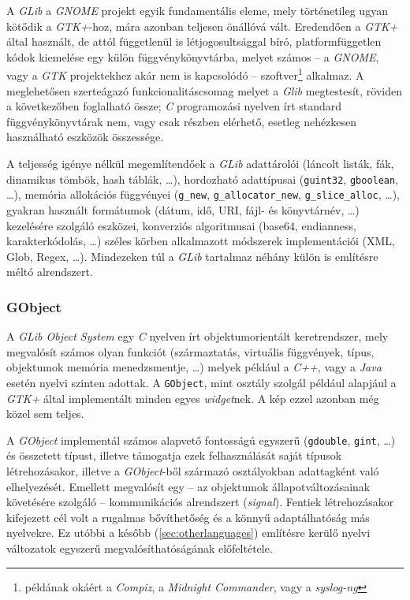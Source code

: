 A \textit{GLib} a \textit{GNOME} projekt egyik fundamentális eleme, mely történetileg ugyan kötődik a \textit{GTK+}-hoz, mára azonban teljesen önállóvá vált. Eredendően a \textit{GTK+} által használt, de attól függetlenül is létjogosultsággal bíró, platformfüggetlen kódok kiemelése egy külön függvénykönyvtárba, melyet számos -- a \textit{GNOME}, vagy a \textit{GTK} projektekhez akár nem is kapcsolódó -- szoftver\footnote{példának okáért a \textit{Compiz}, a \textit{Midnight Commander}, vagy a \textit{syslog-ng}} alkalmaz. A meglehetősen szerteágazó funkcionalitáscsomag melyet a \textit{Glib} megtestesít, röviden a következőben foglalható össze; \textit{C} programozási nyelven írt standard függvénykönyvtárak nem, vagy csak részben elérhető, esetleg nehézkesen használható eszközök összessége.

A teljesség igénye nélkül megemlítendőek a \textit{GLib} adattárolói (láncolt listák, fák, dinamikus tömbök, hash táblák, \dots), hordozható adattípusai (\texttt{guint32}, \texttt{gboolean}, \dots), memória allokációs függvényei (\texttt{g\_new}, \texttt{g\_allocator\_new}, \texttt{g\_slice\_alloc}, \dots), gyakran használt formátumok (dátum, idő, URI, fájl- és könyvtárnév, \dots) kezelésére szolgáló eszközei, konverziós algoritmusai (base64, endianness, karakterkódolás, \dots) széles körben alkalmazott módszerek implementációi (XML, Glob, Regex, \dots). Mindezeken túl a \textit{GLib} tartalmaz néhány külön is említésre méltó alrendszert.

\subsubsection{GObject}

A \textit{GLib Object System} egy \textit{C} nyelven írt objektumorientált keretrendszer, mely megvalósít számos olyan funkciót (származtatás, virtuális függvények, típus, objektumok memória menedzsmentje, \dots) melyek például a \textit{C++}, vagy a \textit{Java} esetén nyelvi szinten adottak. A \texttt{GObject}, mint osztály szolgál például alapjául a \textit{GTK+} által implementált minden egyes \textit{widget}nek. A kép ezzel azonban még közel sem teljes.

A \textit{GObject} implementál számos alapvető fontosságú egyszerű (\texttt{gdouble}, \texttt{gint}, \dots) és összetett típust, illetve támogatja ezek felhasználását saját típusok létrehozásakor, illetve a \textit{GObject}-ből származó osztályokban adattagként való elhelyezését. Emellett megvalósít egy -- az objektumok állapotváltozásainak követésére szolgáló -- kommunikációs alrendszert (\textit{signal}).  Fentiek létrehozásakor kifejezett cél volt a rugalmas bővíthetőség és a könnyű adaptálhatóság más nyelvekre. Ez utóbbi a később (\ref{sec:otherlanguages}) említésre kerülő nyelvi változatok egyszerű megvalósíthatóságának előfeltétele.

